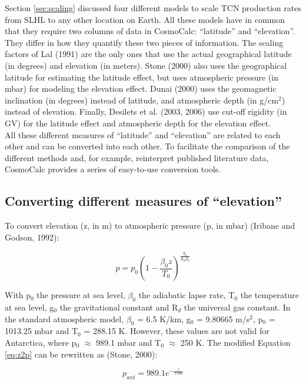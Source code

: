 \documentclass{article}
\begin{document}
Section \ref{sec:scaling} discussed four different models to scale TCN
production rates from  SLHL to any other location  on Earth. All these
models  have  in common  that  they require  two  columns  of data  in
CosmoCalc:  ``latitude'' and  ``elevation''. They  differ in  how they
quantify these two  pieces of information. The scaling  factors of Lal
(1991) are the only ones that use the actual geographical latitude (in
degrees)  and  elevation (in  meters).   Stone  (2000)  also uses  the
geographical  latitude for  estimating the  latitude effect,  but uses
atmospheric  pressure (in  mbar) for  modeling the  elevation  effect. 
Dunai (2000) uses the  geomagnetic inclination (in degrees) instead of
latitude, and  atmospheric depth (in  g/cm$^2$) instead of  elevation. 
Finally, Desilets et al. (2003, 2006) use cut-off rigidity (in GV) for
the latitude effect and atmospheric depth for the elevation effect.
\\

All  these different  measures of  ``latitude'' and  ``elevation'' are
related  to each  other  and can  be  converted into  each other.   To
facilitate the  comparison of the different methods  and, for example,
reinterpret published literature data,  CosmoCalc provides a series of
easy-to-use conversion tools.

\subsection{Converting different measures of ``elevation''}\label{sec:elevation}

To convert  elevation (z, in m)  to atmospheric pressure  (p, in mbar)
(Iribane and Godson, 1992):

\begin{equation}
  \label{eq:z2p}
  p = p_0 \left(1 - \frac{\beta_0 z}{T_0}\right)^{\frac{g_0}{R_d \beta_0}}
\end{equation}

With p$_0$  the pressure at  sea level, $\beta_0$ the  adiabatic lapse
rate,  T$_0$ the  temperature at  sea level,  g$_0$  the gravitational
constant  and  R$_d$ the  universal  gas  constant.   In the  standard
atmospheric  model, $\beta_0$  = 6.5  K/km, g$_0$  =  9.80665 m/s$^2$,
p$_0$ = 1013.25  mbar and T$_0$ = 288.15 K.  However, these values are
not valid for  Antarctica, where p$_0$ $\approx$ 989.1  mbar and T$_0$
$\approx$ 250 K.  The  modified Equation \ref{eq:z2p} can be rewritten
as (Stone, 2000):

\begin{equation}
  \label{eq:z2antP}
  p_{ant} = 989.1 e^{-\frac{z}{7588}}
\end{equation}
\end{document}
